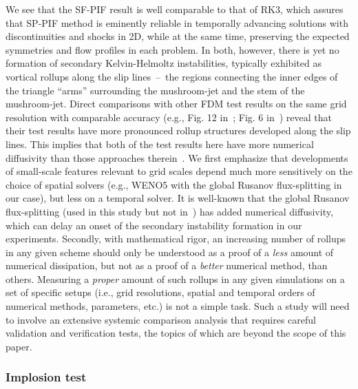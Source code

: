 \documentclass[times,preprint,3p]{elsarticle}
\begin{document}
We see that the SF-PIF result is well comparable to that of RK3,
which assures that SP-PIF method is eminently reliable
in temporally advancing solutions with
discontinuities and shocks in 2D,
while at the same time, preserving the expected symmetries
and flow profiles in each problem.
In both, however, there is yet no formation of secondary
Kelvin-Helmoltz instabilities, typically exhibited as vortical rollups
along the slip lines~--~the regions connecting
the inner edges of the triangle ``arms''
surrounding the mushroom-jet
and the stem of the mushroom-jet.
Direct comparisons with other FDM test results on
the same grid resolution with comparable accuracy
(e.g., Fig. 12 in~\cite{reyes2019variable}; Fig. 6 in~\cite{don2016hybrid})
reveal that their test results have more pronounced
rollup structures developed along the slip lines.
%
This implies that both of the test results here have
more numerical diffusivity than those approaches therein~\cite{don2016hybrid,reyes2019variable}.
We first emphasize that developments of small-scale features
relevant to grid scales depend much more sensitively on the choice of
spatial solvers (e.g., WENO5 with the global Rusanov flux-splitting in our case),
but less on a temporal solver.
It is well-known that the global Rusanov flux-splitting
(used in this study but not in~\cite{don2016hybrid,reyes2019variable})
has added numerical diffusivity, which can delay an onset of the secondary
instability formation in our experiments.
Secondly, with mathematical rigor,
an increasing number of rollups in any given scheme should only be
understood as a proof of a \textit{less} amount of numerical dissipation,
but not as a proof of a \textit{better} numerical method, than others.
Measuring a \textit{proper} amount of such rollups in any given simulations
on a set of specific setups (i.e., grid resolutions, spatial and temporal
orders of numerical methods, parameters, etc.)
is not a simple task. Such a study will need to involve an extensive
systemic comparison analysis that requires
careful validation and verification tests,
the topics of which are beyond the scope of this paper.



\subsubsection{Implosion test}\label{sec:implosion}
\end{document}
